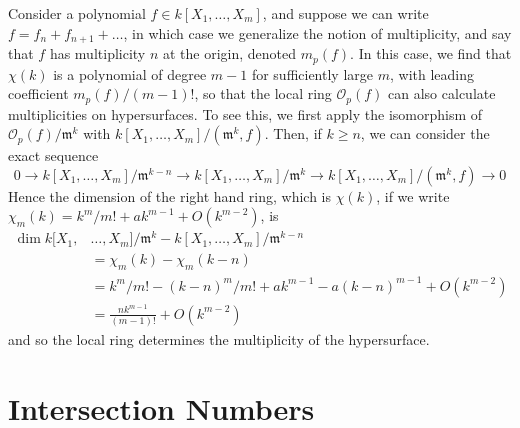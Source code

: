 \begin{example}
    Consider a polynomial $f \in k[X_1, \dots, X_m]$, and suppose we can write $f = f_n + f_{n+1} + \dots$, in which case we generalize the notion of multiplicity, and say that $f$ has multiplicity $n$ at the origin, denoted $m_p(f)$. In this case, we find that $\chi(k)$ is a polynomial of degree $m-1$ for sufficiently large $m$, with leading coefficient $m_p(f)/(m-1)!$, so that the local ring $\mathcal{O}_p(f)$ can also calculate multiplicities on hypersurfaces. To see this, we first apply the isomorphism of $\mathcal{O}_p(f)/\mathfrak{m}^k$ with $k[X_1, \dots, X_m]/(\mathfrak{m}^k,f)$. Then, if $k \geq n$, we can consider the exact sequence
    \[ 0 \to k[X_1, \dots, X_m]/\mathfrak{m}^{k-n} \to k[X_1, \dots, X_m]/\mathfrak{m}^k \to k[X_1, \dots, X_m]/(\mathfrak{m}^k, f) \to 0 \]
    Hence the dimension of the right hand ring, which is $\chi(k)$, if we write $\chi_m(k) = k^m/m! + ak^{m-1} + O(k^{m-2})$, is
    \begin{align*}
        \dim k[X_1,& \dots, X_m]/\mathfrak{m}^k - k[X_1, \dots, X_m]/\mathfrak{m}^{k-n}\\
        &= \chi_m(k) - \chi_m(k-n)\\
        &= k^m/m! - (k-n)^m/m! + ak^{m-1} - a(k-n)^{m-1} + O(k^{m-2})\\
        &= \frac{nk^{m-1}}{(m-1)!} + O(k^{m-2})
    \end{align*}
    and so the local ring determines the multiplicity of the hypersurface.
\end{example}

\section{Intersection Numbers}

